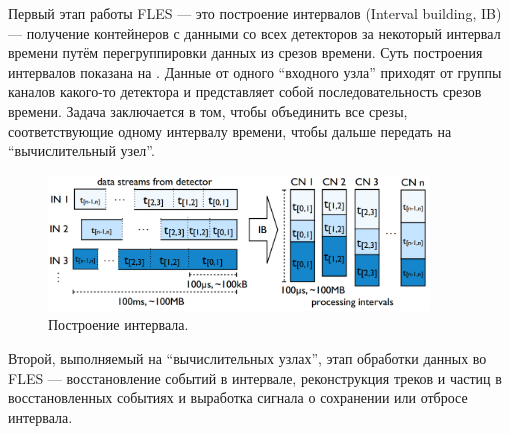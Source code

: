 Первый этап работы FLES --- это построение интервалов (Interval building, IB) --- получение контейнеров с данными со всех детекторов за некоторый интервал времени путём перегруппировки данных из срезов времени. Суть построения интервалов показана на . Данные от одного ``входного узла'' приходят от группы каналов какого-то детектора и представляет собой последовательность срезов времени. Задача заключается в том, чтобы объединить все срезы, соответствующие одному интервалу времени, чтобы дальше передать на ``вычислительный узел''.


\begin{figure}[H]
\centering
\includegraphics[width=0.9\textwidth]{pictures/Interval_building.png}
\caption{Построение интервала.}
\label{fig:IntervalBuilding}
\end{figure}

Второй, выполняемый на ``вычислительных узлах'', этап обработки данных во FLES --- восстановление событий в интервале, реконструкция треков и частиц в восстановленных событиях и выработка сигнала о сохранении или отбросе интервала.

